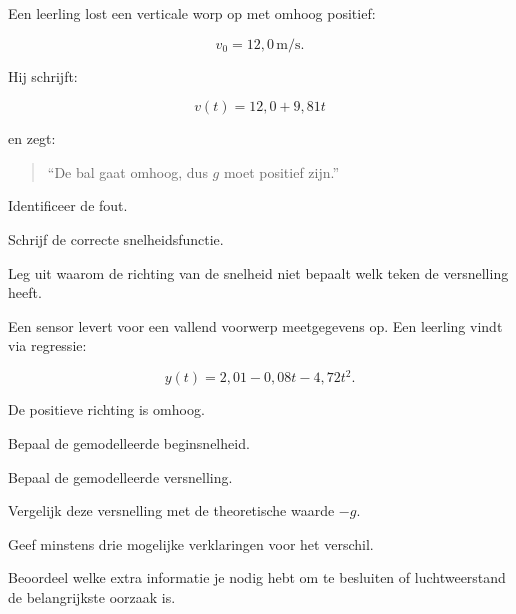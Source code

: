 \documentclass{ximera}
\begin{document}
\begin{oefening}[Foutenanalyse]{\oefU\ESS}

Een leerling lost een verticale worp op met omhoog positief:

\[
v_0=12,0\,\mathrm{m/s}.
\]

Hij schrijft:

\[
v(t)=12,0+9,81t
\]

en zegt:

\begin{quote}
``De bal gaat omhoog, dus $g$ moet positief zijn.''
\end{quote}

\begin{question}
Identificeer de fout.
\end{question}

\begin{question}
Schrijf de correcte snelheidsfunctie.
\end{question}

\begin{question}
Leg uit waarom de richting van de snelheid niet bepaalt welk teken de
versnelling heeft.
\end{question}

\end{oefening}


\begin{oefening}{\oefG}

Een sensor levert voor een vallend voorwerp meetgegevens op. Een
leerling vindt via regressie:

\[
y(t)=2,01-0,08t-4,72t^2.
\]

De positieve richting is omhoog.

\begin{question}
Bepaal de gemodelleerde beginsnelheid.
\end{question}

\begin{question}
Bepaal de gemodelleerde versnelling.
\end{question}

\begin{question}
Vergelijk deze versnelling met de theoretische waarde $-g$.
\end{question}

\begin{question}
Geef minstens drie mogelijke verklaringen voor het verschil.
\end{question}

\begin{question}
Beoordeel welke extra informatie je nodig hebt om te besluiten of
luchtweerstand de belangrijkste oorzaak is.
\end{question}

\end{oefening}
\end{document}
